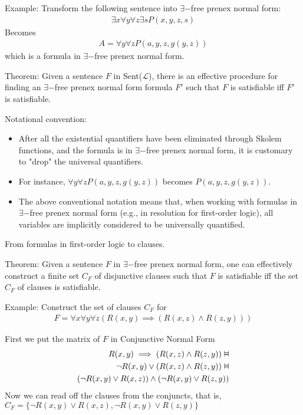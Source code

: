 \documentclass{article}
\newcommand{\vDashv}{%
  \mathrel{%
    \text{%
      \ooalign{$\vDash$\cr\reflectbox{$\vDash$}\cr}%
    }%
  }%
}
\begin{document}
Example: Transform the following sentence into $\exists-$free prenex normal form: 
\begin{align*}
\exists x \forall y \forall z \exists s P(x,y,z,s)
\end{align*}
Becomes
\begin{align*}
A = \forall y \forall z P(a,y,z,g(y,z))
\end{align*}
which is a formula in $\exists-$free prenex normal form.


Theorem: Given a sentence $F$ in Sent($\mathcal{L}$), there is an effective procedure for finding an $\exists-$free prenex normal form formula $F'$ such that $F$ is satisfiable iff $F'$ is satisfiable.

Notational convention:
\begin{itemize}
    \item After all the existential quantifiers have been eliminated through Skolem functions, and the formula is in $\exists-$free prenex normal form, it is customary to "drop" the universal quantifiers.
    \item For instance, $\forall y \forall z P(a,y,z,g(y,z))$ becomes $P(a,y,z,g(y,z))$.
    \item The above conventional notation means that, when working with formulas in $\exists-$free prenex normal form (e.g., in resolution for first-order logic), all variables are implicitly considered to be universally quantified.
\end{itemize}

From formulas in first-order logic to clauses.

Theorem: Given a sentence $F$ in $\exists-$free prenex normal form, one can effectively construct a finite set $C_F$ of disjunctive clauses such that $F$ is satisfiable iff the set $C_F$ of clauses is satisfiable.

Example: Construct the set of clauses $C_F$ for
\begin{align*}
F = \forall x \forall y \forall z (R(x,y) \implies (R(x,z) \wedge R(z,y)))
\end{align*}

First we put the matrix of $F$ in Conjunctive Normal Form
\begin{align*}
R(x,y) \implies (R(x,z) \wedge R(z,y)) \vDashv \\
\neg R(x,y) \vee (R(x,z) \wedge R(z,y)) \vDashv \\
(\neg R(x,y) \vee R(x,z)) \wedge (\neg R(x,y) \vee R(z,y))
\end{align*}
Now we can read off the clauses from the conjuncts, that is, 
$C_F = \{\neg R(x,y) \vee R(x,z), \neg R(x,y) \vee R(z,y)\}$
\end{document}
